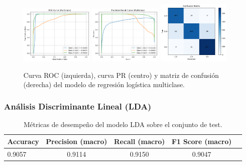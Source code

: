 \documentclass[11pt]{article}
\begin{document}
\begin{figure}[H]
    \centering
    \includegraphics[width=0.32\textwidth]{figures/logistic_roc.png}
    \hfill
    \includegraphics[width=0.32\textwidth]{figures/logistic_pr.png}
    \hfill
    \includegraphics[width=0.32\textwidth]{figures/logistic_conf_matrix.png}
    \caption{Curva ROC (izquierda), curva PR (centro) y matriz de confusión (derecha) del modelo de regresión logística multiclase.}
    \label{fig:logistic_figures}
\end{figure}

\subsubsection*{Análisis Discriminante Lineal (LDA)}
\begin{table}[H]
    \centering
    \begin{tabular}{lcccc}
        \toprule
        \textbf{Accuracy} & \textbf{Precision (macro)} & \textbf{Recall (macro)} & \textbf{F1 Score (macro)} \\
        \midrule
        0.9057 & 0.9114 & 0.9150 & 0.9047 \\
        \bottomrule
    \end{tabular}
    \caption{Métricas de desempeño del modelo LDA sobre el conjunto de test.}
    \label{tab:lda_scores}
\end{table}
\end{document}
